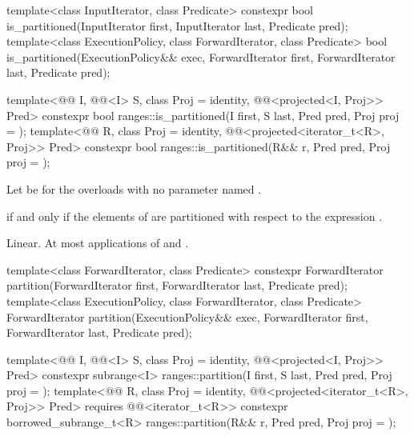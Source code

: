 %
\begin{itemdecl}
template<class InputIterator, class Predicate>
  constexpr bool is_partitioned(InputIterator first, InputIterator last, Predicate pred);
template<class ExecutionPolicy, class ForwardIterator, class Predicate>
  bool is_partitioned(ExecutionPolicy&& exec,
                      ForwardIterator first, ForwardIterator last, Predicate pred);

template<@@ I, @@<I> S, class Proj = identity,
         @@<projected<I, Proj>> Pred>
  constexpr bool ranges::is_partitioned(I first, S last, Pred pred, Proj proj = {});
template<@@ R, class Proj = identity,
         @@<projected<iterator_t<R>, Proj>> Pred>
  constexpr bool ranges::is_partitioned(R&& r, Pred pred, Proj proj = {});
\end{itemdecl}

\begin{itemdescr}
\pnum
Let  be 
for the overloads with no parameter named .

\pnum
\returns
{} if and only if the elements  of 
are partitioned with respect to the expression
.

\pnum
\complexity
Linear.
At most  applications of  and .
\end{itemdescr}

%
\begin{itemdecl}
template<class ForwardIterator, class Predicate>
  constexpr ForwardIterator
    partition(ForwardIterator first, ForwardIterator last, Predicate pred);
template<class ExecutionPolicy, class ForwardIterator, class Predicate>
  ForwardIterator
    partition(ExecutionPolicy&& exec,
              ForwardIterator first, ForwardIterator last, Predicate pred);

template<@@ I, @@<I> S, class Proj = identity,
         @@<projected<I, Proj>> Pred>
  constexpr subrange<I>
    ranges::partition(I first, S last, Pred pred, Proj proj = {});
template<@@ R, class Proj = identity,
         @@<projected<iterator_t<R>, Proj>> Pred>
  requires @@<iterator_t<R>>
  constexpr borrowed_subrange_t<R>
    ranges::partition(R&& r, Pred pred, Proj proj = {});
\end{itemdecl}

